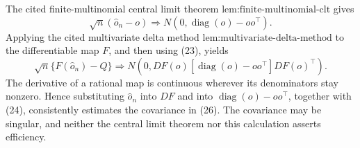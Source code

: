 The cited finite-multinomial central limit theorem
\(\text{lem:finite-multinomial-clt}\) gives
\[
\sqrt n(\widehat o_n-o)
\Rightarrow N(0,\operatorname{diag}(o)-oo^\top).
\tag{25}
\]
Applying the cited multivariate delta method
\(\text{lem:multivariate-delta-method}\) to the differentiable map \(F\), and then using (23), yields
\[
\sqrt n\{F(\widehat o_n)-Q\}
\Rightarrow
N\!\left(0,DF(o)[\operatorname{diag}(o)-oo^\top]DF(o)^\top\right).
\tag{26}
\]
The derivative of a rational map is continuous wherever its denominators stay nonzero.  Hence substituting \(\widehat o_n\) into \(DF\) and into
\(\operatorname{diag}(o)-oo^\top\), together with (24), consistently estimates the covariance in (26).  The covariance may be singular, and neither the central limit theorem nor this calculation asserts efficiency.
